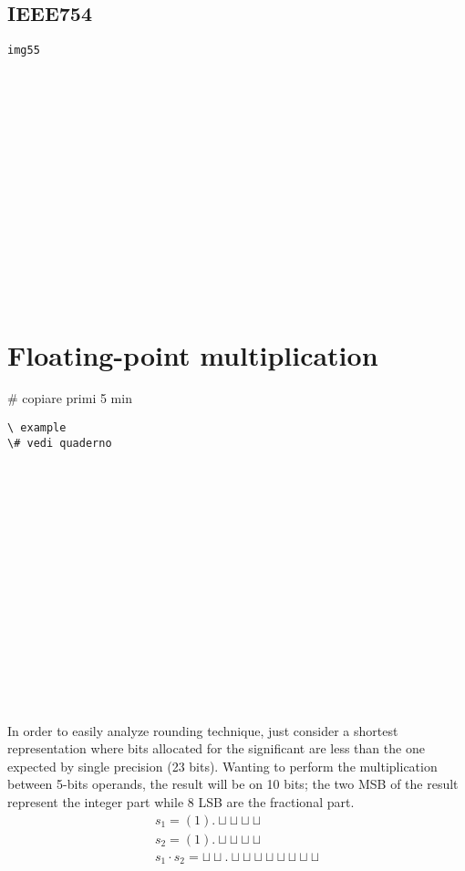 \subsection{IEEE754}

\begin{verbatim}
img55

















\end{verbatim}

\section{Floating-point multiplication}

\# copiare primi 5 min

\begin{verbatim}
\ example
\# vedi quaderno


















\end{verbatim}


In order to easily analyze rounding technique, just consider a shortest
representation where bits allocated for the significant are less than the one
expected by single precision (23 bits). Wanting to perform the multiplication
between 5-bits operands, the result will be on 10 bits; the two MSB of the
result represent the integer part while 8 LSB are the fractional part.
\begin{eqnarray*}
s_1=(1). \sqcup \sqcup \sqcup \sqcup\\
s_2=(1). \sqcup \sqcup \sqcup \sqcup\\
s_1 \cdot s_2= \sqcup \sqcup . \sqcup \sqcup \sqcup \sqcup \sqcup \sqcup \sqcup \sqcup
\end{eqnarray*}

